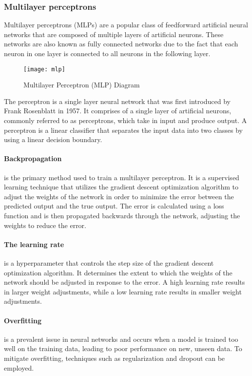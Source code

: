 \subsubsection{Multilayer perceptrons}

Multilayer perceptrons (MLPs) are a popular class of feedforward artificial neural networks that are composed of multiple layers of artificial neurons.
These networks are also known as fully connected networks due to the fact that each neuron in one layer is connected to all neurons in the following layer.

\begin{figure}[!htbp]
  \centering
  \texttt{[image: mlp]}
  \caption{Multilayer Perceptron (MLP) Diagram \cite{uc}}
\end{figure}

The perceptron is a single layer neural network that was first introduced by Frank Rosenblatt in 1957. 
It comprises of a single layer of artificial neurons, commonly referred to as perceptrons, which take in input and produce output. A perceptron is a linear classifier that separates the input data into two classes by using a linear decision boundary.

\paragraph{Backpropagation} is the primary method used to train a multilayer perceptron. It is a supervised learning technique that utilizes the gradient descent optimization algorithm to adjust the weights of the network in order to minimize the error between the predicted output and the true output. The error is calculated using a loss function and is then propagated backwards through the network, adjusting the weights to reduce the error.

\paragraph {The learning rate} is a hyperparameter that controls the step size of the gradient descent optimization algorithm. It determines the extent to which the weights of the network should be adjusted in response to the error. A high learning rate results in larger weight adjustments, while a low learning rate results in smaller weight adjustments.

\paragraph {Overfitting} is a prevalent issue in neural networks and occurs when a model is trained too well on the training data, leading to poor performance on new, unseen data. To mitigate overfitting, techniques such as regularization and dropout can be employed.

